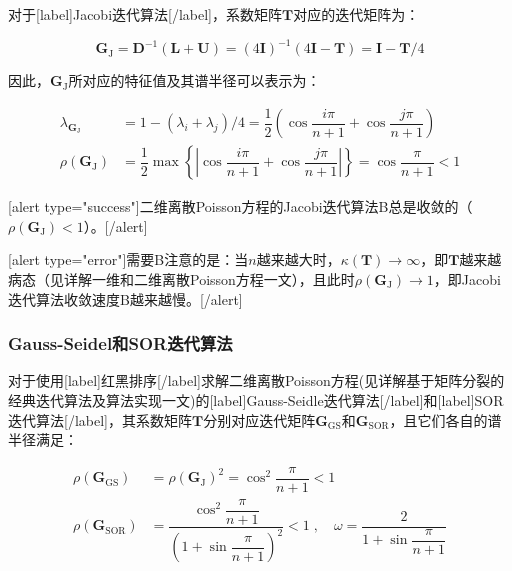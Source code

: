 \documentclass[12pt, UTF8, nofonts]{ctexart}
\begin{document}
对于[label]Jacobi迭代算法[/label]，系数矩阵$\boldsymbol{T}$对应的迭代矩阵为：

\[
    \boldsymbol{G}_{\mathrm{J}} = \boldsymbol{D}^{-1}(\boldsymbol{L} + \boldsymbol{U}) = (4\boldsymbol{I})^{-1}(4\boldsymbol{I}-\boldsymbol{T}) = \boldsymbol{I}-\boldsymbol{T}/4
\]

因此，$\boldsymbol{G}_{\mathrm{J}}$所对应的特征值及其谱半径可以表示为：

\begin{equation}
    \label{eq:rhoj}
    \begin{aligned}
        \lambda_{\boldsymbol{G}_{\mathrm{J}}} &= 1-(\lambda_{i}+\lambda_{j})/4 = \dfrac{1}{2} \left( \cos\dfrac{i\pi}{n+1} + \cos\dfrac{j\pi}{n+1} \right) \\
        \rho(\boldsymbol{G}_{\mathrm{J}}) &= \dfrac{1}{2} \max \left\{ \left| \cos\dfrac{i\pi}{n+1} + \cos\dfrac{j\pi}{n+1} \right| \right\} = \cos\dfrac{\pi}{n+1} < 1
    \end{aligned}
\end{equation}

[alert type="success"]二维离散Poisson方程的Jacobi迭代算法B总是收敛的（$\rho(\boldsymbol{G}_{\mathrm{J}})<1$）。[/alert]

[alert type="error"]需要B注意的是：当$n$越来越大时，$\kappa(\boldsymbol{T})\to\infty$，即$\boldsymbol{T}$越来越病态（见详解一维和二维离散Poisson方程一文），且此时$\rho(\boldsymbol{G}_{\mathrm{J}})\to1$，即Jacobi迭代算法收敛速度B越来越慢。[/alert]

\subsubsection*{Gauss-Seidel和SOR迭代算法}

对于使用[label]红黑排序[/label]求解二维离散Poisson方程(见详解基于矩阵分裂的经典迭代算法及算法实现一文)的[label]Gauss-Seidle迭代算法[/label]和[label]SOR迭代算法[/label]，其系数矩阵$\boldsymbol{T}$分别对应迭代矩阵$\boldsymbol{G}_{\mathrm{GS}}$和$\boldsymbol{G}_{\mathrm{SOR}}$，且它们各自的谱半径满足：

\begin{equation}
    \label{eq:rhogssor}
    \begin{aligned}
        \rho(\boldsymbol{G}_{\mathrm{GS}}) &= \rho(\boldsymbol{G}_{\mathrm{J}})^2 = \cos^2\dfrac{\pi}{n+1} < 1 \\
        \rho(\boldsymbol{G}_{\mathrm{SOR}}) &= \dfrac{\cos^2\dfrac{\pi}{n+1}}{\left(1+\sin\dfrac{\pi}{n+1}\right)^2} < 1 \;,\quad \omega = \dfrac{2}{1+\sin\dfrac{\pi}{n+1}} \\
    \end{aligned}
\end{equation}
\end{document}
